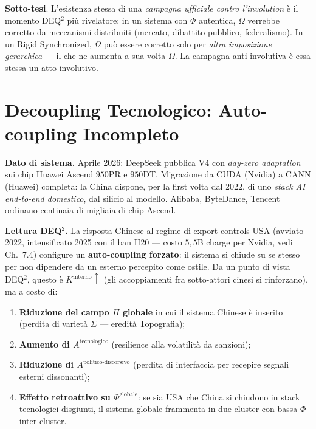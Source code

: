 \Conj{} \textbf{Sotto-tesi}. L'esistenza stessa di una \emph{campagna
ufficiale contro l'involution} è il momento DEQ$^2$ più rivelatore: in un
sistema con \(\Phi\) autentica, \(\Omega\) verrebbe corretto da
meccanismi distribuiti (mercato, dibattito pubblico, federalismo). In un
Rigid Synchronized, \(\Omega\) può essere corretto solo per
\emph{altra imposizione gerarchica} --- il che ne aumenta a sua volta
\(\Omega\). La campagna anti-involutiva è essa stessa un atto
involutivo.



\section{Decoupling Tecnologico: Auto-coupling
Incompleto}\label{decoupling-tecnologico-auto-coupling-incompleto}

\Proved{} \textbf{Dato di sistema.} Aprile 2026: DeepSeek pubblica V4
con \emph{day-zero adaptation} sui chip Huawei Ascend \(950\)PR e
\(950\)DT. Migrazione da CUDA (Nvidia) a CANN (Huawei) completa: la China
dispone, per la first volta dal 2022, di uno \emph{stack AI end-to-end
domestico}, dal silicio al modello. Alibaba, ByteDance, Tencent ordinano
centinaia di migliaia di chip Ascend.

\Hypoth{} \textbf{Lettura DEQ$^2$.} La risposta Chinese al regime di export
controls USA (avviato 2022, intensificato 2025 con il ban H20 --- costo
\(5{,}5\)B charge per Nvidia, vedi Ch.~7.4) configure un
\textbf{auto-coupling forzato}: il sistema si chiude su se stesso
per non dipendere da un esterno percepito come ostile. Da un punto di
vista DEQ$^2$, questo è \(K^{\text{interno}} \uparrow\) (gli accoppiamenti
fra sotto-attori cinesi si rinforzano), ma a costo di:

\begin{enumerate}
\def\labelenumi{\arabic{enumi}.}
\tightlist
\item
  \textbf{Riduzione del campo \(\Pi\) globale} in cui il sistema Chinese
  è inserito (perdita di varietà \(\Sigma\) --- eredità Topografia);
\item
  \textbf{Aumento di \(A^{\text{tecnologico}}\)} (resilience alla
  volatilità da sanzioni);
\item
  \textbf{Riduzione di \(A^{\text{politico-discorsivo}}\)} (perdita di
  interfaccia per recepire segnali esterni dissonanti);
\item
  \textbf{Effetto retroattivo su \(\Phi^{\text{globale}}\)}: se sia USA
  che China si chiudono in stack tecnologici disgiunti, il sistema
  globale frammenta in due cluster con bassa \(\Phi\) inter-cluster.
\end{enumerate}

